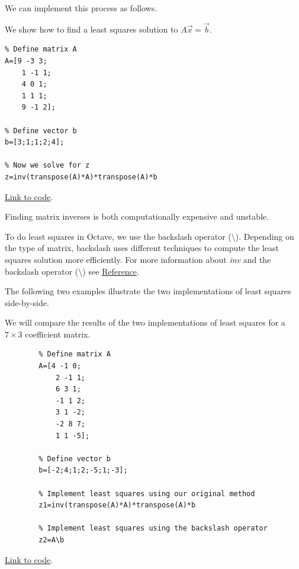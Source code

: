 \documentclass{ximera}
\begin{document}
We can implement this process as follows.
 
\begin{template}\label{temp:leastSq}
    We show how to find a least squares solution to $A\vec{x}=\vec{b}$.
 
    \begin{verbatim}
% Define matrix A
A=[9 -3 3;
    1 -1 1;
    4 0 1;
    1 1 1;
    9 -1 2];
         
% Define vector b
b=[3;1;1;2;4];
 
% Now we solve for z
z=inv(transpose(A)*A)*transpose(A)*b
    \end{verbatim}
 
\href{https://sagecell.sagemath.org/?z=eJxTVXBJTcvMS1XITSwpyqxQcOTlcrSNtlTQNVYwtublUgACQwVdQwVDKMdEwQDONgRBawUIxxKkyigWKgUCvFyqMMPLUpNL8osUkni5kmyjja0NgdDI2gSkGKTIL79coTxVoTg_pyxVIQ2oroqXq8o2M69Mo6QoMa-4IL84VcNRUwuIUPhJAN_XLTM=&lang=octave&interacts=eJyLjgUAARUAuQ==}{Link to code}.   
\end{template}
 
\begin{warning}
    Finding matrix inverses is both computationally expensive and unstable. 
\end{warning}
 
To do least squares in Octave, we use the backslash operator ($\setminus$). Depending on the type of matrix, backslash uses different techniques to compute the least squares solution more efficiently.  For more information about \emph{inv} and the backslash operator ($\setminus$) see \href{https://www.mathworks.com/help/matlab/ref/inv.html}{Reference}.
 
The following two examples illustrate the two implementations of least squares side-by-side.
 
\begin{example}\label{ex:LeastSquaresComp1}
  We will compare the results of the two implementations of least squares for a $7\times 3$ coefficient matrix.
   
      \begin{verbatim}
        % Define matrix A
        A=[4 -1 0;
            2 -1 1;
            6 3 1;
            -1 1 2;
            3 1 -2;
            -2 8 7;
            1 1 -5];
                 
        % Define vector b
        b=[-2;4;1;2;-5;1;-3];
         
        % Implement least squares using our original method
        z1=inv(transpose(A)*A)*transpose(A)*b
         
        % Implement least squares using the backslash operator
        z2=A\b       
      \end{verbatim}
   
  \href{https://sagecell.sagemath.org/?z=eJyNjstqwzAQRfcC_cPdBNKAIFZeBeGFoZt-Q5qFlExiUVtyJDmUfn0l4hSyyzAwc2buPGb4oLN1hF6nYH_QcNbU-zVEhaXiDNlkgWqCLVb_eSlDKtwp1yHkoyXxjt0ERSY2h4mKcTZ73L3RMfkAw5mp93l-rSolldjkIFZlpmg_-6GjnlxCRzomxOuoA0WM0boL_Bjgg71Ypzv0lFp_4uy3qq27zVPQLg4-0rx5W2R_YvPK9tQSjD5-x07HFn6goPPD-YCsmy_zB_2HVXs=&lang=octave&interacts=eJyLjgUAARUAuQ==}{Link to code}.  
   
  \end{example}
   
\end{document}

